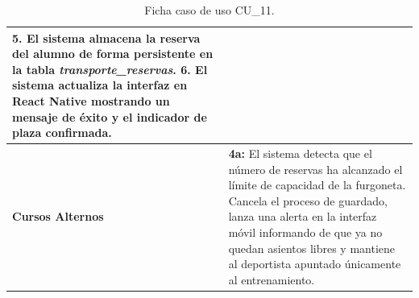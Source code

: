 \begin{table}[htbp]
\begin{tabularx}{\textwidth}{|l|X|}
        \textbf{5.} El sistema almacena la reserva del alumno de forma persistente en la tabla \textit{transporte\_reservas}.\newline
        \textbf{6.} El sistema actualiza la interfaz en React Native mostrando un mensaje de éxito y el indicador de plaza confirmada. \\ \hline
        \textbf{Cursos Alternos} & 
        \textbf{4a:} El sistema detecta que el número de reservas ha alcanzado el límite de capacidad de la furgoneta. Cancela el proceso de guardado, lanza una alerta en la interfaz móvil informando de que ya no quedan asientos libres y mantiene al deportista apuntado únicamente al entrenamiento. \\ \hline
        \end{tabularx}
        \caption{Ficha caso de uso CU\_11.}
        \label{tab:cu_11_reserva}
        \end{table}

        \clearpage

